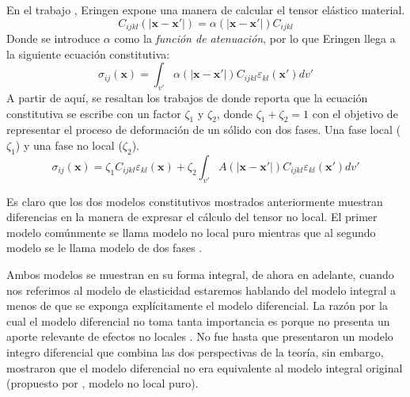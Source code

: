 \documentclass{article}
\begin{document}
En el trabajo , Eringen expone una manera de calcular el tensor elástico material.
\begin{equation}
	C_{ijkl}(|\boldsymbol{x}-\boldsymbol{x'}|)=\alpha(|\boldsymbol{x}-\boldsymbol{x'}|)C_{ijkl}
\end{equation}
Donde se introduce $\alpha$ como la \textit{función de atenuación}, por lo que Eringen llega a la siguiente ecuación constitutiva:
\begin{equation}
	\sigma_{ij}(\boldsymbol{x})=\int_{v'}\alpha(|\boldsymbol{x}-\boldsymbol{x'}|)C_{ijkl}\varepsilon_{kl}(\boldsymbol{x'})dv'
	\label{eq:eringen}
\end{equation}
A partir de aquí, se resaltan los trabajos de \textcite{Polizzotto2001} donde reporta que la ecuación constitutiva se escribe con un factor $\zeta_1$ y $\zeta_2$, donde $\zeta_1+\zeta_2=1$ con el objetivo de representar el proceso de deformación de un sólido con dos fases. Una fase local ($\zeta_1$) y una fase no local ($\zeta_2$). 
\begin{equation}
	\sigma_{ij}(\boldsymbol{x})=\zeta_1C_{ijkl}\varepsilon_{kl}(\boldsymbol{x})+\zeta_2\int_{v'}A(|\boldsymbol{x}-\boldsymbol{x'}|)C_{ijkl}\varepsilon_{kl}(\boldsymbol{x'})dv'
	\label{eq:polizzotto}
\end{equation}

Es claro que los dos modelos constitutivos mostrados anteriormente muestran diferencias en la manera de expresar el cálculo del tensor no local. El primer modelo comúnmente se llama modelo no local puro \parencite{Eringen1983} mientras que al segundo modelo se le llama modelo de dos fases \parencite{Eringen1987}.

Ambos modelos se muestran en su forma integral, de ahora en adelante, cuando nos referimos al modelo de elasticidad estaremos hablando del modelo integral a menos de que se exponga explícitamente el modelo diferencial. La razón por la cual el modelo diferencial no toma tanta importancia es porque no presenta un aporte relevante de efectos no locales \parencite{Wang2016}. No fue hasta que \textcite{Khodabakhshi2015} presentaron un modelo integro diferencial que combina las dos perspectivas de la teoría, sin embargo, \textcite{Fernandez-Saez2016} mostraron que el modelo diferencial no era equivalente al modelo integral original (propuesto por \textcite{Eringen1983}, modelo no local puro).
\end{document}
